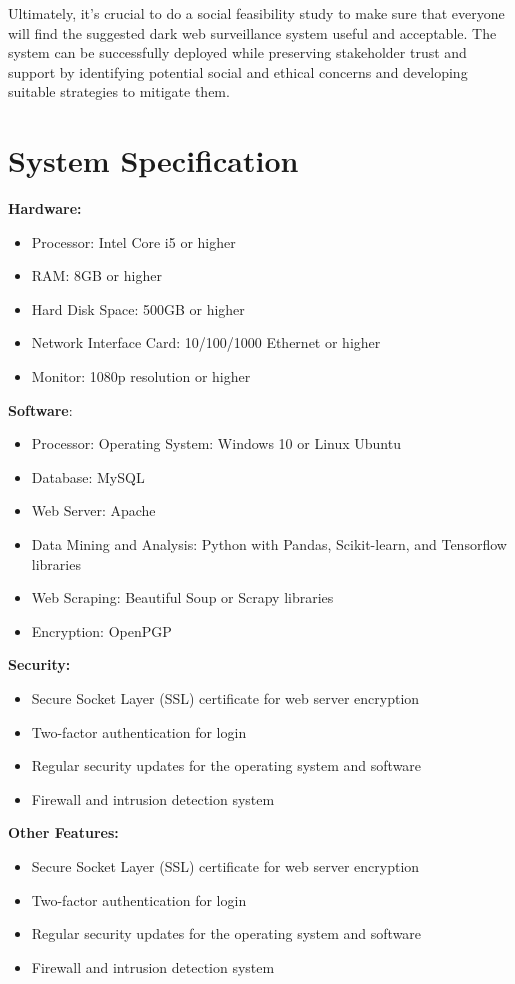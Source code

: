 \documentclass[10pt]{report}
\begin{document}
Ultimately, it's crucial to do a social feasibility study to make sure that everyone will find the suggested dark web surveillance system useful and acceptable. The system can be successfully deployed while preserving stakeholder trust and support by identifying potential social and ethical concerns and developing suitable strategies to mitigate them.

\section{System Specification}
\textbf{Hardware:}
\begin{itemize}
    \item Processor: Intel Core i5 or higher
    \item RAM: 8GB or higher
    \item Hard Disk Space: 500GB or higher
    \item Network Interface Card: 10/100/1000 Ethernet or higher
    \item Monitor: 1080p resolution or higher
\end{itemize}

\textbf{Software}:
\begin{itemize}
    \item Processor: Operating System: Windows 10 or Linux Ubuntu
    \item Database: MySQL
    \item Web Server: Apache
    \item Data Mining and Analysis: Python with Pandas, Scikit-learn, and Tensorflow libraries
    \item Web Scraping: Beautiful Soup or Scrapy libraries
    \item Encryption: OpenPGP 
\end{itemize}

\textbf{Security:}
\begin{itemize}
    \item Secure Socket Layer (SSL) certificate for web server encryption
    \item Two-factor authentication for login
    \item Regular security updates for the operating system and software
    \item Firewall and intrusion detection system
\end{itemize}

\textbf{Other Features:}
\begin{itemize}
    \item Secure Socket Layer (SSL) certificate for web server encryption
    \item Two-factor authentication for login
    \item Regular security updates for the operating system and software
    \item Firewall and intrusion detection system
\end{itemize}
\end{document}
